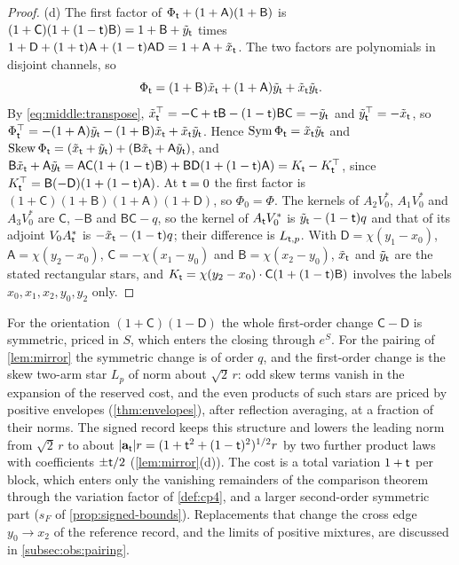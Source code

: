 \begin{proof}
(d) The first factor of $\Phi_\mathsf t+(1+\mathsf A)(1+\mathsf B)$ is
$(1+\mathsf C)(1+(1-\mathsf t)\mathsf B)=1+\mathsf B+\tilde y_\mathsf t$ times
$1+\mathsf D+(1+\mathsf t)\mathsf A+(1-\mathsf t)\mathsf A\mathsf D=1+\mathsf A+\tilde x_\mathsf t$.
The two factors are polynomials in disjoint channels, so
\[
 \Phi_\mathsf t=(1+\mathsf B)\tilde x_\mathsf t+(1+\mathsf A)\tilde y_\mathsf t
 +\tilde x_\mathsf t\tilde y_\mathsf t .
\]
By \eqref{eq:middle:transpose}, $\tilde x_\mathsf t^\top=-\mathsf C+\mathsf t\mathsf B
-(1-\mathsf t)\mathsf B\mathsf C=-\tilde y_\mathsf t$ and $\tilde y_\mathsf t^\top=-\tilde x_\mathsf t$,
so $\Phi_\mathsf t^\top=-(1+\mathsf A)\tilde y_\mathsf t-(1+\mathsf B)\tilde x_\mathsf t
+\tilde x_\mathsf t\tilde y_\mathsf t$. Hence $\operatorname{Sym}\Phi_\mathsf t=\tilde x_\mathsf t\tilde y_\mathsf t$
and $\operatorname{Skew}\Phi_\mathsf t=(\tilde x_\mathsf t+\tilde y_\mathsf t)+(\mathsf B\tilde x_\mathsf t
+\mathsf A\tilde y_\mathsf t)$, and
$\mathsf B\tilde x_\mathsf t+\mathsf A\tilde y_\mathsf t=\mathsf A\mathsf C(1+(1-\mathsf t)\mathsf B)
+\mathsf B\mathsf D(1+(1-\mathsf t)\mathsf A)=K_\mathsf t-K_\mathsf t^\top$, since
$K_\mathsf t^\top=\mathsf B(-\mathsf D)(1+(1-\mathsf t)\mathsf A)$. At $\mathsf t=0$ the first
factor is $(1+\mathsf C)(1+\mathsf B)(1+\mathsf A)(1+\mathsf D)$, so $\Phi_0=\Phi$. The
kernels of $A_2V_0^*$, $A_1V_0^*$ and $A_3V_0^*$ are $\mathsf C$, $-\mathsf B$ and
$\mathsf B\mathsf C-q$, so the kernel of $A_\mathsf t V_0^*$ is $\tilde y_\mathsf t-(1-\mathsf t)q$
and that of its adjoint $V_0A_\mathsf t^*$ is $-\tilde x_\mathsf t-(1-\mathsf t)q$; their
difference is $L_{\mathsf t,p}$. With $\mathsf D=\chi(y_1-x_0)$, $\mathsf A=\chi(y_2-x_0)$,
$\mathsf C=-\chi(x_1-y_0)$ and $\mathsf B=\chi(x_2-y_0)$, $\tilde x_\mathsf t$ and
$\tilde y_\mathsf t$ are the stated rectangular stars, and
$K_\mathsf t=\chi(y_2-x_0)\cdot\mathsf C(1+(1-\mathsf t)\mathsf B)$ involves the labels
$x_0,x_1,x_2,y_0,y_2$ only.
\end{proof}

\begin{remark}\label{rem:mirror-why}
For the orientation $(1+\mathsf C)(1-\mathsf D)$ the whole first-order change
$\mathsf C-\mathsf D$ is symmetric, priced in $S$, which enters the closing
through $e^S$. For the pairing of \cref{lem:mirror} the symmetric change is of
order $q$, and the first-order change is the skew two-arm star $L_p$ of norm
about $\sqrt2\,r$: odd skew terms vanish in the expansion of the reserved cost,
and the even products of such stars are priced by positive envelopes
(\cref{thm:envelopes}), after reflection averaging, at a fraction of their
norms. The signed record keeps this structure and lowers the leading norm from
$\sqrt2\,r$ to about $|\mathbf a_\mathsf t|r=(1+\mathsf t^2+(1-\mathsf t)^2)^{1/2}r$ by two further
product laws with coefficients $\pm\mathsf t/2$ (\cref{lem:mirror}(d)). The cost is
a total variation $1+\mathsf t$ per block, which enters only the vanishing
remainders of the comparison theorem through the variation factor of
\cref{def:cp4}, and a larger second-order symmetric part ($s_F$ of
\cref{prop:signed-bounds}). Replacements that change the cross edge
$y_0\to x_2$ of the reference record, and the limits of positive mixtures, are
discussed in \cref{subsec:obs:pairing}.
\end{remark}

